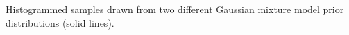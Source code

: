 \label{fig:priorgmm}
Histogrammed samples drawn from two different Gaussian mixture model prior distributions (solid lines).
